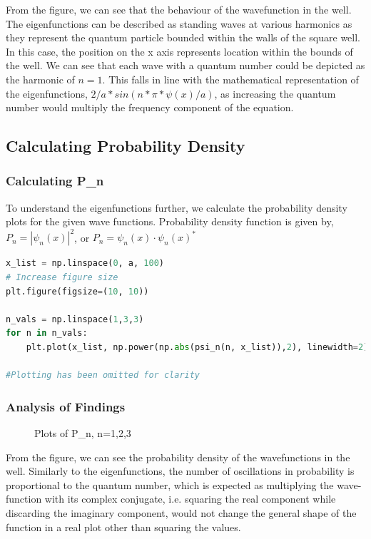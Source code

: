\documentclass[a4paper,12pt]{article}
\begin{document}
From the figure, we can see that the behaviour of the wavefunction in the well. 
The eigenfunctions can be described as standing waves at various harmonics as they represent the quantum particle bounded within the walls of the square well. In this case, the position on the x axis represents location within the bounds of the well.
We can see that each wave with a quantum number could be depicted as the harmonic of \(n=1\). This falls in line with the mathematical representation of the eigenfunctions, \(2/a * sin(n*\pi*\psi(x)/a) \), as increasing the quantum number would multiply the frequency component of the equation.  

\subsection{Calculating Probability Density}
\subsubsection{Calculating P_n}
To understand the eigenfunctions further, we calculate the probability density plots for the given wave functions. Probability density function is given by, \(P_n = |\psi_n(x)|^2\), or \(P_n = \psi_n(x) \cdot \psi_n(x)^*\) \cite{eisenberg}

\begin{lstlisting}[language=Python, caption= Code used to plot Probability Densities]
x_list = np.linspace(0, a, 100)
# Increase figure size
plt.figure(figsize=(10, 10))

n_vals = np.linspace(1,3,3)
for n in n_vals:
    plt.plot(x_list, np.power(np.abs(psi_n(n, x_list)),2), linewidth=2)

#Plotting has been omitted for clarity
\end{lstlisting}

\subsubsection{Analysis of Findings}
\begin{figure}[H]

\caption{Plots of P_n, n=1,2,3}
\end{figure}
From the figure, we can see the probability density of the wavefunctions in the well. Similarly to the eigenfunctions, the number of oscillations in probability is proportional to the quantum number, which is expected as multiplying the wave-function with its complex conjugate, i.e. squaring the real component while discarding the imaginary component, would not change the general shape of the function in a real plot other than squaring the values. 
\end{document}
